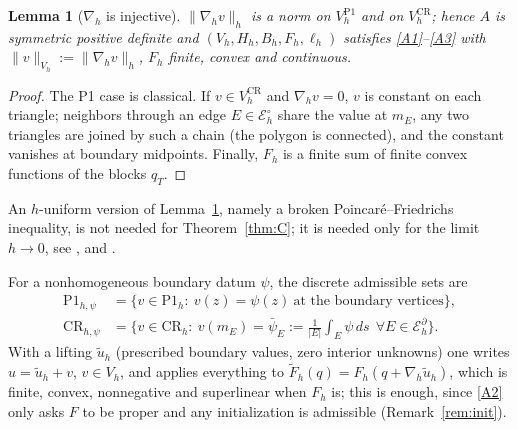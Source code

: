 \documentclass[11pt]{amsart}
\newtheorem{lemma}[theorem]{Lemma}
\theoremstyle{definition}
\theoremstyle{remark}
\numberwithin{equation}{section}
\newcommand{\abs}[1]{\lvert #1\rvert}
\newcommand{\norm}[1]{\lVert #1\rVert}
\newcommand{\CR}{\mathrm{CR}}
\newcommand{\Pone}{\mathrm{P1}}
\newcommand{\Eb}{\mathcal E_h^{\partial}}
\newcommand{\Ei}{\mathcal E_h^{\circ}}
\begin{document}
\begin{lemma}[$\nabla_h$ is injective]\label{lem:CRnorm}
$\norm{\nabla_hv}_h$ is a norm on $V_h^{\Pone}$ and on $V_h^{\CR}$; hence $A$ is symmetric positive definite and $(V_h,H_h,B_h,F_h,\ell_h)$ satisfies \ref{A1}--\ref{A3} with $\norm v_{V_h}:=\norm{\nabla_hv}_h$, $F_h$ finite, convex and continuous.
\end{lemma}
\begin{proof}
The P1 case is classical. If $v\in V_h^{\CR}$ and $\nabla_hv=0$, $v$ is constant on each triangle; neighbors through an edge $E\in\Ei$ share the value at $m_E$, any two triangles are joined by such a chain (the polygon is connected), and the constant vanishes at boundary midpoints. Finally, $F_h$ is a finite sum of finite convex functions of the blocks $q_T$.
\end{proof}
An $h$-uniform version of Lemma~\ref{lem:CRnorm}, namely a broken Poincar\'e--Friedrichs inequality, is not needed for Theorem~\ref{thm:C}; it is needed only for the limit $h\to0$, see \cite[(4.4)]{Ortner2011}, \cite{BuffaOrtner2009} and \cite[Lemma~3]{BalciOrtnerStorn2022}.

For a nonhomogeneous boundary datum $\psi$, the discrete admissible sets are
\[
\begin{aligned}
\Pone_{h,\psi}&=\{v\in\Pone_h:\ v(z)=\psi(z)\ \text{at the boundary vertices}\},\\
\CR_{h,\psi}&=\Big\{v\in\CR_h:\ v(m_E)=\bar\psi_E:=\frac1{\abs E}\int_E\psi\,ds\ \ \forall E\in\Eb\Big\}.
\end{aligned}
\]
With a lifting $\tilde u_h$ (prescribed boundary values, zero interior unknowns) one writes $u=\tilde u_h+v$, $v\in V_h$, and applies everything to $\tilde F_h(q)=F_h(q+\nabla_h\tilde u_h)$, which is finite, convex, nonnegative and superlinear when $F_h$ is; this is enough, since \ref{A2} only asks $F$ to be proper and any initialization is admissible (Remark~\ref{rem:init}).
\end{document}
